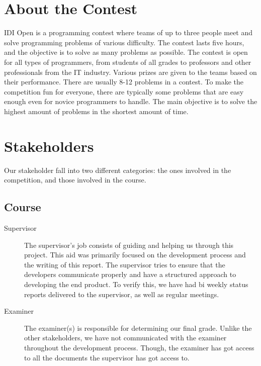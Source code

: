 \section{About the Contest}
IDI Open is a programming contest where teams of up to three people meet
and solve programming problems of various difficulty. The contest lasts
five hours, and the objective is to solve as many problems as possible.
The contest is open for all types of programmers, from students of all
grades to professors and other professionals from the IT industry.
Various prizes are given to the teams based on their performance. There
are usually 8-12 problems in a contest. To make the competition fun for
everyone, there are typically some problems that are easy enough even
for novice programmers to handle. The main objective is to solve the
highest amount of problems in the shortest amount of time.

\section{Stakeholders}
Our stakeholder fall into two different categories: the ones involved in
the competition, and those involved in the course.
\subsection{Course}

\begin{description}
\item[Supervisor]
The supervisor's job consists of guiding and helping us
through this project. This aid was primarily focused on the development
process and the writing of this report. The supervisor tries to ensure
that the developers communicate properly and have a structured approach
to developing the end product. To verify this, we have had bi weekly
status reports delivered to the supervisor, as well as regular
meetings.

\item[Examiner]
The examiner(s) is responsible for determining our final grade. Unlike
the other stakeholders, we have not communicated with the examiner
throughout the development process. Though, the examiner has got access
to all the documents the supervisor has got access to.
\end{description}

